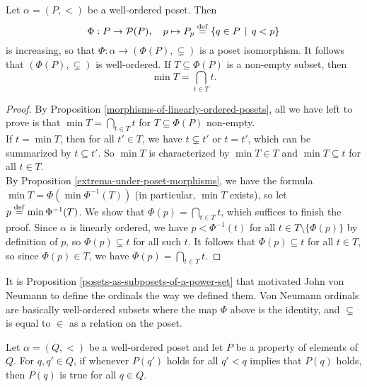 \begin{proposition} \label{posets-as-subposets-of-a-power-set}
    Let $\alpha = (P, <)$ be a well-ordered poset. Then
    \[
        \Phi : P \to \operatorname{\mathcal P}(P), \quad p \mapsto P_p \overset{\mathrm{def}}{=} \{ q \in P \, \mid \, q < p \}
    \]
    is increasing, so that $\Phi : \alpha \to (\Phi(P), \subsetneq)$ is a poset isomorphism. It follows that $(\Phi(P), \subsetneq)$ is well-ordered. If $T \subseteq \Phi(P)$ is a non-empty subset, then
    \[
        \min T = \bigcap_{t \in T} t.    
    \]
\end{proposition}

\begin{proof}
    By Proposition \autoref{morphisms-of-linearly-ordered-posets}, all we have left to prove is that $\min T = \bigcap_{t \in T} t$ for $T \subseteq \Phi(P)$ non-empty. 
    \\
    
    If $t = \min T$, then for all $t' \in T$, we have $t \subsetneq t'$ or $t = t'$, which can be summarized by $t \subseteq t'$. So $\min T$ is characterized by $\min T \in T$ and $\min T \subseteq t$ for all $t \in T$. 
    \\

    By Proposition \autoref{extrema-under-poset-morphisms}, we have the formula $\min T = \Phi(\min \Phi^{-1}(T))$ (in particular, $\min T$ exists), so let $p \overset{\mathrm{def}}{=} \min \Phi^{-1}(T)$. We show that $\Phi(p) = \bigcap_{t \in T} t$, which suffices to finish the proof. Since $\alpha$ is linearly ordered, we have $p < \Phi^{-1}(t)$ for all $t \in T \setminus \{\Phi(p)\}$ by definition of $p$, so $\Phi(p) \subsetneq t$ for all such $t$. It follows that $\Phi(p) \subseteq t$ for all $t \in T$, so since $\Phi(p) \in T$, we have $\Phi(p) = \bigcap_{t \in T} t$.
\end{proof}

\begin{remark}
    It is Proposition \autoref{posets-as-subposets-of-a-power-set} that motivated John von Neumann to define the ordinals the way we defined them. Von Neumann ordinals are basically well-ordered subsets where the map $\Phi$ above is the identity, and $\subsetneq$ is equal to $\in$ as a relation on the poset.
\end{remark}

\begin{theorem} \label{transfinite-induction}
    Let $\alpha = (Q, <)$ be a well-ordered poset and let $P$ be a property of elements of $Q$. For $q,q' \in Q$, if whenever $P(q')$ holds for all $q' < q$ implies that $P(q)$ holds, then $P(q)$ is true for all $q \in Q$. 
\end{theorem}

